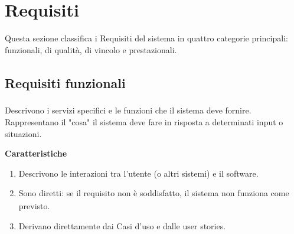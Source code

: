 ﻿\documentclass[a4paper,11pt]{article}
\begin{document}
\vspace{0.5cm}

\section{Requisiti}

Questa sezione classifica i Requisiti del sistema in quattro categorie principali: funzionali, di qualità\textsubscript{}, di vincolo e prestazionali.

\subsection{Requisiti funzionali\textsubscript{}}
Descrivono i servizi specifici e le funzioni che il sistema deve fornire. Rappresentano il "cosa" il sistema deve fare in risposta a determinati input o situazioni.
\vspace{0.5cm}

\textbf{Caratteristiche}
\begin{enumerate}
    \item Descrivono le interazioni tra l'utente (o altri sistemi) e il software.
    \item Sono diretti: se il requisito\textsubscript{} non è soddisfatto, il sistema non funziona come previsto.
    \item Derivano direttamente dai Casi d'uso\textsubscript{} e dalle user stories.
\end{enumerate}


\vspace{0.5cm}


\renewcommand{\arraystretch}{1.2}
\setlength{\tabcolsep}{4pt}

\newcommand{\wCod}{2.2cm}
\newcommand{\wFonti}{2.6cm}
\newcommand{\wPrio}{2.8cm}
\newcommand{\wDesc}{%
  \dimexpr\textwidth-\wCod-\wFonti-\wPrio-6\tabcolsep-5\arrayrulewidth\relax
}


\newcommand{\autoRF}{%
  \stepcounter{rfCounter}%
  RF-%
  \ifnum\value{rfCounter}<100 0\fi %
  \ifnum\value{rfCounter}<10 0\fi  %
  \arabic{rfCounter}%
}

\setcounter{rfCounter}{0}
\end{document}
